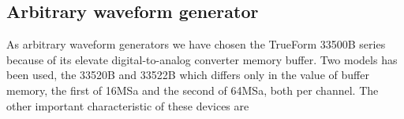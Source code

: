 \subsection{Arbitrary waveform generator}
As arbitrary waveform generators we have chosen the TrueForm 33500B series because of its elevate digital-to-analog converter memory buffer. Two models has been used, the 33520B and 33522B which differs only in the value of buffer memory, the first of 16MSa and the second of 64MSa, both per channel. The other important characteristic of these devices are
